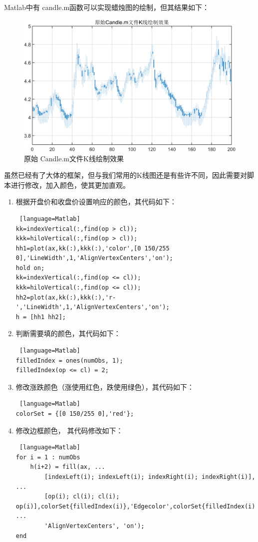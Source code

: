 \documentclass{jnuthesis}
\begin{document}
Matlab中有 candle.m函数可以实现蜡烛图的绘制，但其结果如下：
\begin{figure}[H]
	\centering
	\includegraphics[width=0.8\linewidth]{pic/screenshot031}
	\caption{原始 Candle.m文件K线绘制效果}
	\label{fig:screenshot031}
\end{figure}

虽然已经有了大体的框架，但与我们常用的K线图还是有些许不同，因此需要对脚本进行修改，加入颜色，使其更加直观。
\begin{enumerate}
	\item 根据开盘价和收盘价设置响应的颜色，其代码如下：
	\begin{lstlisting} [language=Matlab]
kk=indexVertical(:,find(op > cl));
kkk=hiloVertical(:,find(op > cl));
hh1=plot(ax,kk(:),kkk(:),'color',[0 150/255 0],'LineWidth',1,'AlignVertexCenters','on');
hold on;
kk=indexVertical(:,find(op <= cl));
kkk=hiloVertical(:,find(op <= cl));
hh2=plot(ax,kk(:),kkk(:),'r-','LineWidth',1,'AlignVertexCenters','on');
h = [hh1 hh2];
	\end{lstlisting}
	
		\item 判断需要填的颜色，其代码如下：
	\begin{lstlisting} [language=Matlab]
filledIndex = ones(numObs, 1);
filledIndex(op <= cl) = 2;
	\end{lstlisting}
	\item 修改涨跌颜色（涨使用红色，跌使用绿色），其代码如下：
	\begin{lstlisting} [language=Matlab]
colorSet = {[0 150/255 0],'red'};
	\end{lstlisting}
	\item 修改边框颜色，
	其代码修改如下：
\begin{lstlisting} [language=Matlab]
for i = 1 : numObs
	h(i+2) = fill(ax, ...
		[indexLeft(i); indexLeft(i); indexRight(i); indexRight(i)], ...
		[op(i); cl(i); cl(i); op(i)],colorSet{filledIndex(i)},'Edgecolor',colorSet{filledIndex(i)}, ...
		'AlignVertexCenters', 'on');
end	
\end{lstlisting}
	
\end{enumerate}
\end{document}
